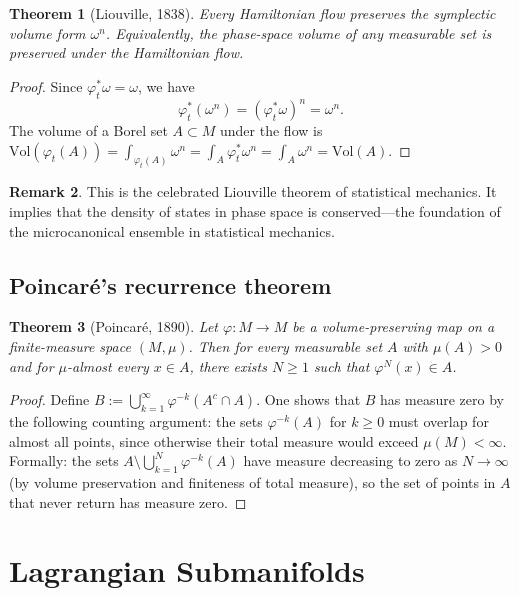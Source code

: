 \documentclass[12pt,a4paper]{amsart}
\newtheorem{theorem}{Theorem}[section]
\theoremstyle{definition}
\newtheorem{remark}[theorem]{Remark}
\begin{document}
\begin{theorem}[Liouville, 1838]\label{thm:liouville}
Every Hamiltonian flow preserves the symplectic volume form $\omega^n$.
Equivalently, the phase-space volume of any measurable set is preserved under
the Hamiltonian flow.
\end{theorem}

\begin{proof}
Since $\varphi_t^*\omega = \omega$, we have
\[
  \varphi_t^*(\omega^n) = (\varphi_t^*\omega)^n = \omega^n.
\]
The volume of a Borel set $A \subset M$ under the flow is
$\mathrm{Vol}(\varphi_t(A)) = \int_{\varphi_t(A)} \omega^n
= \int_A \varphi_t^*\omega^n = \int_A \omega^n = \mathrm{Vol}(A)$.
\end{proof}

\begin{remark}
This is the celebrated Liouville theorem of statistical mechanics.  It
implies that the density of states in phase space is conserved---the
foundation of the microcanonical ensemble in statistical mechanics.
\end{remark}

\subsection{Poincar\'{e}'s recurrence theorem}

\begin{theorem}[Poincar\'{e}, 1890]\label{thm:poincare}
Let $\varphi: M \to M$ be a volume-preserving map on a finite-measure
space $(M, \mu)$.  Then for every measurable set $A$ with $\mu(A) > 0$ and
for $\mu$-almost every $x \in A$, there exists $N \geq 1$ such that
$\varphi^N(x) \in A$.
\end{theorem}

\begin{proof}
Define $B := \bigcup_{k=1}^{\infty} \varphi^{-k}(A^c \cap A)$.  One shows
that $B$ has measure zero by the following counting argument: the sets
$\varphi^{-k}(A)$ for $k \geq 0$ must overlap for almost all points, since
otherwise their total measure would exceed $\mu(M) < \infty$.  Formally:
the sets $A \setminus \bigcup_{k=1}^N \varphi^{-k}(A)$ have measure
decreasing to zero as $N \to \infty$ (by volume preservation and finiteness
of total measure), so the set of points in $A$ that never return has
measure zero.
\end{proof}

\section{Lagrangian Submanifolds}
\label{sec:lagrangian}
\end{document}
